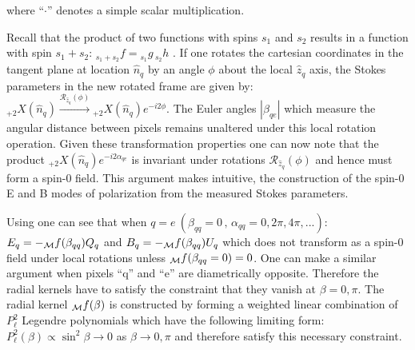 %
where ``$\cdot$'' denotes a simple scalar multiplication.  

Recall that the product of two functions with spins $s_1$ and $s_2$ results in a function with spin $s_1 + s_2$: ${}_{s_1 +s_2}f = {}_{s_1}g \,{}_{s_2}h$ . If one rotates the cartesian coordinates in the tangent plane at location $\hat{n}_q$ by an angle $\phi$ about the local $\hat{z}_q$ axis, the Stokes parameters in the new rotated frame are given by: ${}_{+2}X(\hat{n}_q) \xrightarrow{\mathcal{R}_{\hat{z}_q}(\phi)} {}_{+2}X(\hat{n}_q) e^{-i2\phi} $.  The Euler angles $|\beta_{qe}|$ which measure the angular distance between pixels remains unaltered under this local rotation operation.  Given these transformation properties one can now note that the product ${}_{+2}X(\hat{n}_q)e^{-i2\alpha_{qe}}$ is invariant under rotations  $\mathcal{R}_{\hat{z}_q}(\phi)$ and hence must form a spin-0 field.  This argument makes intuitive, the construction of the spin-0 E and B modes of polarization from the measured Stokes parameters. 

Using  one can see that when $q=e ~(\beta_{qq}=0\,,\, \alpha_{qq}=0,2\pi,4\pi,...)$: $E_q=-{{}_{\mathcal{M}}f}(\beta_{qq})Q_q$ and $B_q = -{{}_{\mathcal{M}}f}(\beta_{qq})U_q$ which does not transform as a spin-0 field under local rotations unless ${{}_{\mathcal{M}}f}(\beta_{qq}=0)=0$. One can make a similar argument when pixels ``q'' and ``e'' are diametrically opposite. Therefore the radial kernels have to satisfy the constraint that they vanish at $\beta = 0, \pi$. The radial kernel ${{}_{\mathcal{M}}f}(\beta)$ is constructed by forming a weighted linear combination of $P_{\ell}^2$ Legendre polynomials which have the following limiting form: $P_{\ell}^2(\beta) \propto \sin^2{\beta} \rightarrow 0 $ as $\beta \rightarrow 0 ,\pi$ and therefore satisfy this necessary constraint. 

